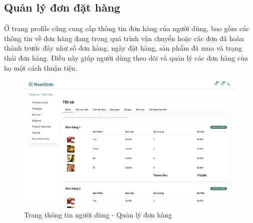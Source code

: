 \subsection{Quản lý đơn đặt hàng}
Ở trang profile cũng cung cấp thông tin đơn hàng của người dùng, bao gồm các thông tin về đơn hàng đang trong quá trình vận chuyển hoặc các đơn đã hoàn thành trước đây như số đơn hàng, ngày đặt hàng, sản phẩm đã mua và trạng thái đơn hàng. Điều này giúp người dùng theo dõi và quản lý các đơn hàng của họ một cách thuận tiện.
    \begin{figure}[H]
        \begin{center}
        \includegraphics[width=\linewidth] {Images/UI/client order.png}
        \end{center}
        \caption{Trang thông tin người dùng - Quản lý đơn hàng}
    \end{figure}

